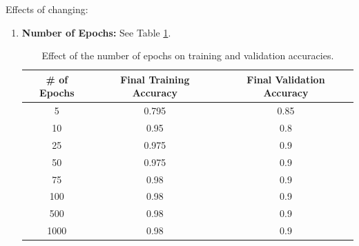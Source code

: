 \documentclass{article}
\begin{document}
Effects of changing:
\begin{enumerate}
  \item \textbf{Number of Epochs:} See Table \ref{tab:epochs}.
        \begin{table}[ht]
          \label{tab:epochs}
          \begin{center}
            \caption{Effect of the number of epochs on training and validation accuracies.}
            \begin{tabular}{|c|c|c|}
              \hline
              \# of Epochs & Final Training Accuracy & Final Validation Accuracy \\ \hline
              5            & 0.795                   & 0.85                      \\ \hline
              10           & 0.95                    & 0.8                       \\ \hline
              25           & 0.975                   & 0.9                       \\ \hline
              50           & 0.975                   & 0.9                       \\ \hline
              75           & 0.98                    & 0.9                       \\ \hline
              100          & 0.98                    & 0.9                       \\ \hline
              500          & 0.98                    & 0.9                       \\ \hline
              1000         & 0.98                    & 0.9                       \\ \hline
            \end{tabular}
          \end{center}
        \end{table}


\end{enumerate}
\end{document}
